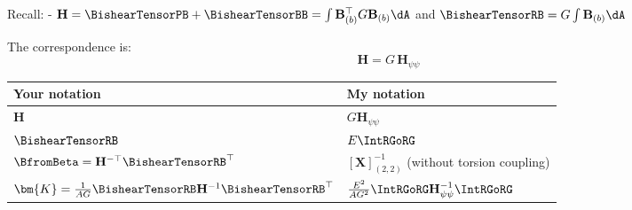 Recall: -
\(\mathbf{H} = \BishearTensorPB + \BishearTensorBB = \int \mathbf{B}_{(b)}^\top G \mathbf{B}_{(b)} \dA\)
and \(\BishearTensorRB = G\int \mathbf{B}_{(b)} \dA\) 

The correspondence is: \[\boxed{\mathbf{H} = G\,\mathbf{H}_{\psi\psi}}\]

\begin{longtable}[]{@{}
  >{\raggedright\arraybackslash}p{}
  >{\raggedright\arraybackslash}p{}@{}}
\toprule\noalign{}
\begin{minipage}[b]{\linewidth}\raggedright
Your notation
\end{minipage} & \begin{minipage}[b]{\linewidth}\raggedright
My notation
\end{minipage} \\
\midrule\noalign{}
\endhead
\bottomrule\noalign{}
\endlastfoot
\(\mathbf{H}\) & \(G\mathbf{H}_{\psi\psi}\) \\
\(\BishearTensorRB\) & \(E\IntRGoRG\) \\
\(\BfromBeta = \mathbf{H}^{-\top}\BishearTensorRB^\top\) &
\([\mathbf{X}]_{(2,2)}^{-1}\) (without torsion coupling) \\
\(\bm{K} = \frac{1}{AG}\BishearTensorRB\mathbf{H}^{-1}\BishearTensorRB^\top\)
& \(\frac{E^2}{AG^2}\IntRGoRG\mathbf{H}_{\psi\psi}^{-1}\IntRGoRG\) \\
\end{longtable}

